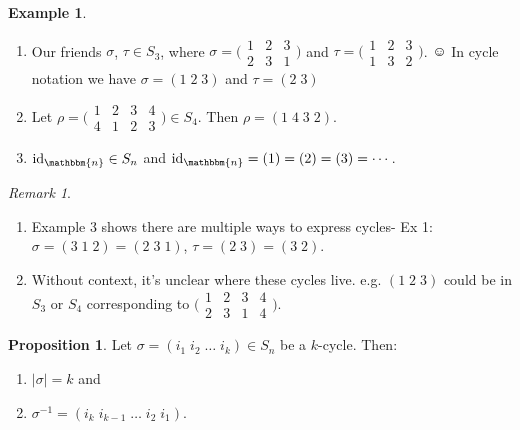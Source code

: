 \documentclass{article}
\newcommand{\id}{\mathrm{id}}
\newcommand{\inverse}[1]{#1^{-1}}
\theoremstyle{definition}
\newtheorem*{prop}{Proposition}
\newtheorem*{ex}{Example}
\theoremstyle{remark}
\newtheorem*{rmk}{Remark}
\begin{document}
{{            \begin{ex}
                \begin{enumerate}
                    \item Our friends $\sigma$, $\tau \in S_3$, where $\sigma=\big(\begin{smallmatrix} 1&2&3\\ 2&3&1 \end{smallmatrix}\big)$ and $\tau=\big(\begin{smallmatrix} 1&2&3\\ 1&3&2 \end{smallmatrix}\big)$. $\smiley$ In cycle notation we have $\sigma=(1\;2\;3)$ and $\tau=(2\;3)$
                    \item Let $\rho=\big(\begin{smallmatrix} 1&2&3&4\\ 4&1&2&3 \end{smallmatrix}\big)\in S_4$. Then $\rho=(1\;4\;3\;2)$.
                    \item $\id_\mathbbm{n}\in S_n$ and $\id_\mathbbm{n}=(1)=(2)=(3)=\cdots$.
                \end{enumerate}
            \end{ex}
            
            \begin{rmk}
                \begin{enumerate}
                    \item Example 3 shows there are multiple ways to express cycles- Ex 1: $\sigma=(3\;1\;2)=(2\;3\;1)$, $\tau=(2\;3)=(3\;2)$.
                    \item Without context, it's unclear where these cycles live. e.g. $(1\;2\;3)$ could be in $S_3$ or $S_4$ corresponding to $\big(\begin{smallmatrix} 1&2&3&4\\ 2&3&1&4 \end{smallmatrix}\big)$.
                \end{enumerate}
            \end{rmk}
            
            \begin{prop}
                Let $\sigma=(i_1\;i_2\;\ldots\;i_k)\in S_n$ be a $k$-cycle. Then:
                \begin{enumerate}
                    \item $|\sigma|=k$ and
                    \item $\inverse{\sigma}=(i_k\;i_{k-1}\;\ldots\;i_2\;i_1)$.
                \end{enumerate}
            \end{prop}
        }
    }
    
\end{document}
